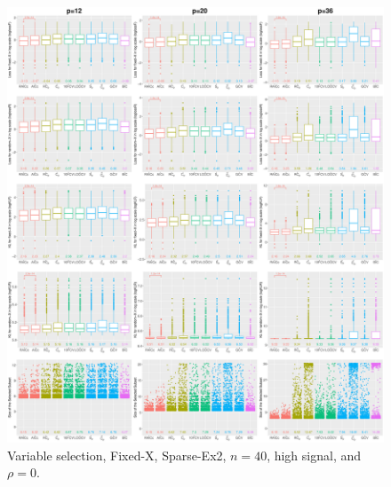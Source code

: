 \begin{figure}[!ht]
\centering
\includegraphics[width=\textwidth]{figures/supplement/fixedx/subset_selection/Sparse-Ex2_n40_hsnr_rho0.eps}
\caption{Variable selection, Fixed-X, Sparse-Ex2, $n=40$, high signal, and $\rho=0$.}
\end{figure}
\clearpage

